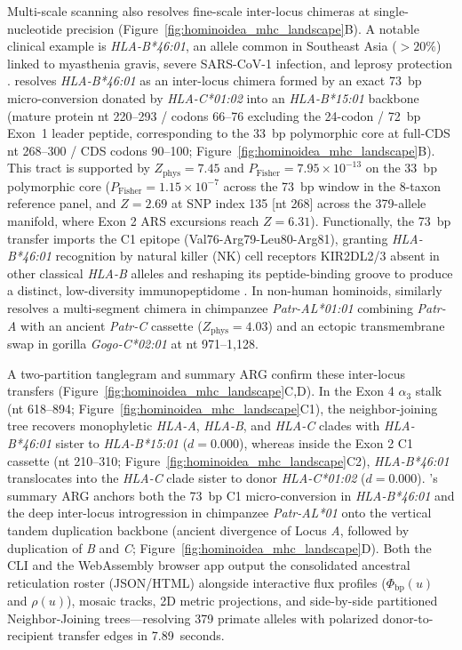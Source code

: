 Multi-scale scanning also resolves fine-scale inter-locus chimeras at single-nucleotide precision (Figure~\ref{fig:hominoidea_mhc_landscape}B). A notable clinical example is \textit{HLA-B*46:01}, an allele common in Southeast Asia ($>20\%$) linked to myasthenia gravis, severe SARS-CoV-1 infection, and leprosy protection \citep{hawkins1984strong,lin2003association,hilton2017intergenic}. \RhizAeon resolves \textit{HLA-B*46:01} as an inter-locus chimera formed by an exact 73~bp micro-conversion donated by \textit{HLA-C*01:02} into an \textit{HLA-B*15:01} backbone (mature protein nt 220--293 / codons 66--76 excluding the 24-codon / 72~bp Exon~1 leader peptide, corresponding to the 33~bp polymorphic core at full-CDS nt 268--300 / CDS codons 90--100; Figure~\ref{fig:hominoidea_mhc_landscape}B). This tract is supported by $Z_{\mathrm{phys}} = 7.45$ and $P_{\mathrm{Fisher}} = 7.95 \times 10^{-13}$ on the 33~bp polymorphic core ($P_{\mathrm{Fisher}} = 1.15 \times 10^{-7}$ across the 73~bp window in the 8-taxon reference panel, and $Z = 2.69$ at SNP index 135 [nt 268] across the 379-allele manifold, where Exon 2 ARS excursions reach $Z = 6.31$). Functionally, the 73~bp transfer imports the C1 epitope (Val76-Arg79-Leu80-Arg81), granting \textit{HLA-B*46:01} recognition by natural killer (NK) cell receptors KIR2DL2/3 absent in other classical \textit{HLA-B} alleles \citep{barber1996inter} and reshaping its peptide-binding groove to produce a distinct, low-diversity immunopeptidome \citep{hilton2017intergenic}. In non-human hominoids, \RhizAeon similarly resolves a multi-segment chimera in chimpanzee \textit{Patr-AL*01:01} combining \textit{Patr-A} with an ancient \textit{Patr-C} cassette ($Z_{\mathrm{phys}} = 4.03$) and an ectopic transmembrane swap in gorilla \textit{Gogo-C*02:01} at nt 971--1,128.

A two-partition tanglegram and summary ARG confirm these inter-locus transfers (Figure~\ref{fig:hominoidea_mhc_landscape}C,D). In the Exon 4 $\alpha_3$ stalk (nt 618--894; Figure~\ref{fig:hominoidea_mhc_landscape}C1), the neighbor-joining tree recovers monophyletic \textit{HLA-A}, \textit{HLA-B}, and \textit{HLA-C} clades with \textit{HLA-B*46:01} sister to \textit{HLA-B*15:01} ($d = 0.000$), whereas inside the Exon 2 C1 cassette (nt 210--310; Figure~\ref{fig:hominoidea_mhc_landscape}C2), \textit{HLA-B*46:01} translocates into the \textit{HLA-C} clade sister to donor \textit{HLA-C*01:02} ($d = 0.000$). \RhizAeon's summary ARG anchors both the 73~bp C1 micro-conversion in \textit{HLA-B*46:01} and the deep inter-locus introgression in chimpanzee \textit{Patr-AL*01} onto the vertical tandem duplication backbone (ancient divergence of Locus \textit{A}, followed by duplication of \textit{B} and \textit{C}; Figure~\ref{fig:hominoidea_mhc_landscape}D). Both the CLI and the WebAssembly browser app output the consolidated ancestral reticulation roster (JSON/HTML) alongside interactive flux profiles ($\Phi_{\mathrm{bp}}(u)$ and $\rho(u)$), mosaic tracks, 2D metric projections, and side-by-side partitioned Neighbor-Joining trees—resolving 379 primate alleles with polarized donor-to-recipient transfer edges in 7.89~seconds.
